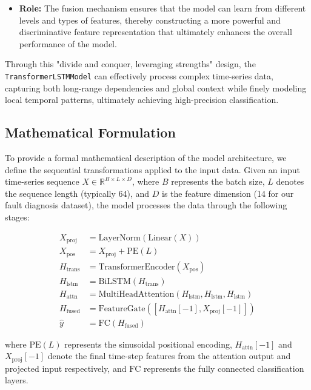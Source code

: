 \begin{itemize}
\begin{itemize}
        \item \textbf{Role:} The fusion mechanism ensures that the model can learn from different levels and types of features, thereby constructing a more powerful and discriminative feature representation that ultimately enhances the overall performance of the model.
    \end{itemize}
\end{itemize}

Through this "divide and conquer, leveraging strengths" design, the \texttt{TransformerLSTMModel} can effectively process complex time-series data, capturing both long-range dependencies and global context while finely modeling local temporal patterns, ultimately achieving high-precision classification.

\subsection{Mathematical Formulation}
\label{subsec:mathematical_formulation}

To provide a formal mathematical description of the model architecture, we define the sequential transformations applied to the input data. Given an input time-series sequence $X \in \mathbb{R}^{B \times L \times D}$, where $B$ represents the batch size, $L$ denotes the sequence length (typically 64), and $D$ is the feature dimension (14 for our fault diagnosis dataset), the model processes the data through the following stages:

\begin{align}
X_{\text{proj}} &= \text{LayerNorm}(\text{Linear}(X)) \label{eq:input_projection} \\
X_{\text{pos}} &= X_{\text{proj}} + \text{PE}(L) \label{eq:positional_encoding} \\
H_{\text{trans}} &= \text{TransformerEncoder}(X_{\text{pos}}) \label{eq:transformer} \\
H_{\text{lstm}} &= \text{BiLSTM}(H_{\text{trans}}) \label{eq:lstm} \\
H_{\text{attn}} &= \text{MultiHeadAttention}(H_{\text{lstm}}, H_{\text{lstm}}, H_{\text{lstm}}) \label{eq:attention} \\
H_{\text{fused}} &= \text{FeatureGate}([H_{\text{attn}}[-1], X_{\text{proj}}[-1]]) \label{eq:fusion} \\
\hat{y} &= \text{FC}(H_{\text{fused}}) \label{eq:output}
\end{align}

where $\text{PE}(L)$ represents the sinusoidal positional encoding, $H_{\text{attn}}[-1]$ and $X_{\text{proj}}[-1]$ denote the final time-step features from the attention output and projected input respectively, and $\text{FC}$ represents the fully connected classification layers.

